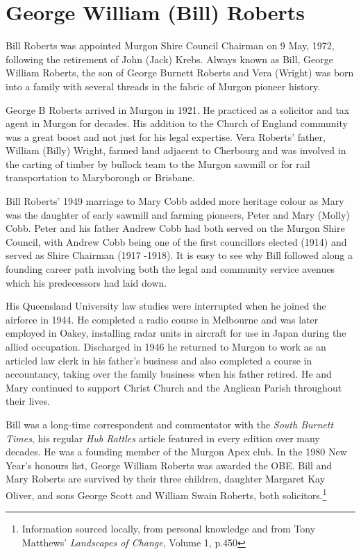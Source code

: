 \section{George William (Bill) Roberts}



Bill Roberts was appointed Murgon Shire Council Chairman on 9 May, 1972, following the retirement of John (Jack) Krebs. Always known as Bill, George William Roberts, the son of George Burnett Roberts and Vera (Wright) was born into a family with several threads in the fabric of Murgon pioneer history.



George B Roberts arrived in Murgon in 1921. He practiced as a solicitor and tax agent in Murgon for decades. His addition to the Church of England community was a great boost and not just for his legal expertise. Vera Roberts' father, William (Billy) Wright, farmed land adjacent to Cherbourg and was involved in the carting of timber by bullock team to the Murgon sawmill or for rail transportation to Maryborough or Brisbane.



Bill Roberts' 1949 marriage to Mary Cobb added more heritage colour as Mary was the daughter of early sawmill and farming pioneers, Peter and Mary (Molly) Cobb. Peter and his father Andrew Cobb had both served on the Murgon Shire Council, with Andrew Cobb being one of the first councillors elected (1914) and served as Shire Chairman (1917 -1918). It is easy to see why Bill followed along a founding career path involving both the legal and community service avenues which his predecessors had laid down.



His Queensland University law studies were interrupted when he joined the airforce in 1944. He completed a radio course in Melbourne and was later employed in Oakey, installing radar units in aircraft for use in Japan during the allied occupation. Discharged in 1946 he returned to Murgon to work as an articled law clerk in his father's business and also completed a course in accountancy, taking over the family business when his father retired. He and Mary continued to support Christ Church and the Anglican Parish throughout their lives.



Bill was a long-time correspondent and commentator with the \emph{South Burnett Times}, his regular \emph{Hub Rattles} article featured in every edition over many decades. He was a founding member of the Murgon Apex club. In the 1980 New Year's honours list, George William Roberts was awarded the OBE. Bill and Mary Roberts are survived by their three children, daughter Margaret Kay Oliver, and sons George Scott and William Swain Roberts, both solicitors.\footnote{Information sourced locally, from personal knowledge and from Tony Matthews' \emph{Landscapes of Change}, Volume 1, p.450}


